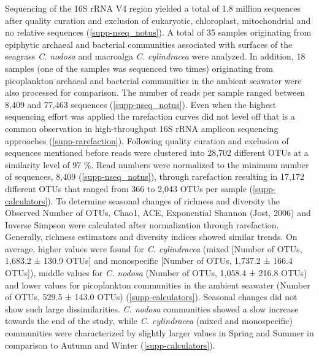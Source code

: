 \documentclass[12pt,]{article}
\begin{document}
Sequencing of the 16S rRNA V4 region yielded a total of 1.8 million
sequences after quality curation and exclusion of eukaryotic,
chloroplast, mitochondrial and no relative sequences
(\autoref{supp-nseq_notus}). A total of 35 samples originating from
epiphytic archaeal and bacterial communities associated with surfaces of
the seagrass \emph{C. nodosa} and macroalga \emph{C. cylindracea} were
analyzed. In addition, 18 samples (one of the samples was sequenced two
times) originating from picoplankton archaeal and bacterial communities
in the ambient seawater were also processed for comparison. The number
of reads per sample ranged between 8,409 and 77,463 sequences
(\autoref{supp-nseq_notus}). Even when the highest sequencing effort was
applied the rarefaction curves did not level off that is a common
observation in high-throughput 16S rRNA amplicon sequencing approaches
(\autoref{supp-rarefaction}). Following quality curation and exclusion
of sequences mentioned before reads were clustered into 28,702 different
OTUs at a similarity level of 97 \si{\percent}. Read numbers were
normalized to the minimum number of sequences, 8,409
(\autoref{supp-nseq_notus}), through rarefaction resulting in 17,172
different OTUs that ranged from 366 to 2,043 OTUs per sample
(\autoref{supp-calculators}). To determine seasonal changes of richness
and diversity the Observed Number of OTUs, Chao1, ACE, Exponential
Shannon (Jost, 2006) and Inverse Simpson were calculated after
normalization through rarefaction. Generally, richness estimators and
diversity indices showed similar trends. On average, higher values were
found for \emph{C. cylindracea} (mixed {[}Number of OTUs, 1,683.2 ±
130.9 OTUs{]} and monospecific {[}Number of OTUs, 1,737.2 ± 166.4
OTUs{]}), middle values for \emph{C. nodosa} (Number of OTUs, 1,058.4 ±
216.8 OTUs) and lower values for picoplankton communities in the ambient
seawater (Number of OTUs, 529.5 ± 143.0 OTUs)
(\autoref{supp-calculators}). Seasonal changes did not show such large
dissimilarities. \emph{C. nodosa} communities showed a slow increase
towards the end of the study, while \emph{C. cylindracea} (mixed and
monospecific) communities were characterized by slightly larger values
in Spring and Summer in comparison to Autumn and Winter
(\autoref{supp-calculators}).
\end{document}
